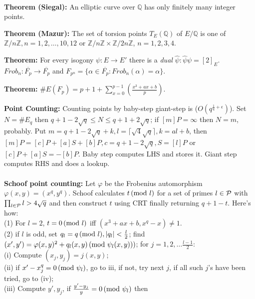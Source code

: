 \\
{\bf Theorem (Siegal):}  An elliptic curve over ${\mathbb Q}$ has only finitely many
integer points.
\begin{quote}
\end{quote}
{\bf Theorem (Mazur):}  The set of torsion points $T_E({\mathbb Q})$ of
$E/{\mathbb Q}$ is one of 
${\mathbb Z}/n{\mathbb Z}, n= 1,2,\ldots,10,12$ or
${\mathbb Z}/n{\mathbb Z} \times
{\mathbb Z}/2n{\mathbb Z}$, $n= 1,2,3,4$.
\begin{quote}
\end{quote}
{\bf Theorem:}
For every isogony $\psi:E \rightarrow E'$ there is a \emph{dual} $\hat{\psi}:
\hat{\psi} \psi= [2]_E$.  $Frob_n: 
{\overline {F_p}} \rightarrow
{\overline {F_p}}$ and $F_{p^n}= \{ \alpha \in {\overline {F_p}}: Frob_n( \alpha )= \alpha \}$.
\begin{quote}
\end{quote}
{\bf Theorem:}
$\#E(F_p)= p+1 + \sum_{x=0}^{p-1} ({\frac {x^3+ax+b} {p}})$.
\begin{quote}
\end{quote}
{\bf Point Counting:} 
Counting points by
baby-step giant-step is ($O(q^{{\frac 1 4} + \epsilon})$). Set
$N= \#E_q$ then 
$q+1 - 2 {\sqrt q} \le N \le q+1 + 2 {\sqrt q}$; if $[m]P= \infty$ then $N=m$, probably.
Put $m=q+1- 2{\sqrt q} +k, l= \lceil {\sqrt 4 {\sqrt q}} \rceil, k= al+b$, then
$[m]P= [c]P + [a]S + [b] P, c= q+1-2{\sqrt q}, S= [l]P$ or $[c]P+ [a]S = - [b] P$.  Baby
step computes LHS and stores it.  Giant step computes RHS and does a lookup.
\\
\\
{\bf Schoof point counting:}
Let $\varphi$ be the Frobenius automorphism $\varphi(x,y)= (x^q , y^q )$.  
Schoof calculates
$t \thinspace \textnormal{(mod } l \textnormal{)}$ for a set of primes $l \in {\cal P}$ with 
$\prod_{l \in {\cal P}} l > {4 {\sqrt q}}$ and then 
construct $t$ using CRT finally returning $q+1-t$.
Here's how:\\
\jt (1) For $l=2$, $t= 0 \thinspace \textnormal{(mod } l \textnormal{)}$ iff 
$(x^3+ax+b,x^q-x) \ne 1$.  \\
\jt (2) if $l$ is odd, set $q_l = q \thinspace \textnormal{(mod } l \textnormal{)}, |q_l| < {\frac l 2}$;
find $(x', y')= \varphi(x,y)^2 + q_l (x,y) \thinspace \textnormal{(mod } \psi_l (x,y)) \textnormal{)}$;
for $j= 1,2, \ldots {\frac {l-1} 2}$:\\
\jt \jt
(i) Compute $(x_j , y_j)=j(x,y)$; \\
\jt \jt
(ii) if
$x'-x_j^q = 0 \thinspace \textnormal{(mod } \psi_l \textnormal{)}$, go to iii, if not, try next $j$, if all such
$j$'s have been tried, go to (iv); \\
\jt \jt
(iii) Compute $y', y_j$, if ${\frac {y'-y_j} y} = 0 \thinspace \textnormal{(mod } \psi_l \textnormal{)}$ then 
